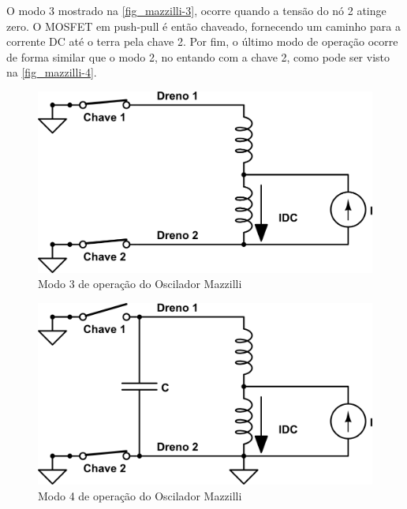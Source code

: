 O modo 3 mostrado na \autoref{fig_mazzilli-3}, ocorre quando a tensão do nó 2 atinge zero. O MOSFET em push-pull é então chaveado, fornecendo um caminho para a corrente DC até o terra pela chave 2. Por fim, o último modo de operação ocorre de forma similar que o modo 2, no entando com a chave 2, como pode ser visto na \autoref{fig_mazzilli-4}.

\begin{figure}[h!tb]
\caption{\label{fig_mazzilli-3}Modo 3 de operação do Oscilador Mazzilli}
\begin{center}
\includegraphics[scale=0.3]{images/mazzilli-3.png}
\end{center}
\end{figure}

\begin{figure}[htb]
\caption{\label{fig_mazzilli-4}Modo 4 de operação do Oscilador Mazzilli}
\begin{center}
\includegraphics[scale=0.3]{images/mazzilli-4.png}
\end{center}
\end{figure}

